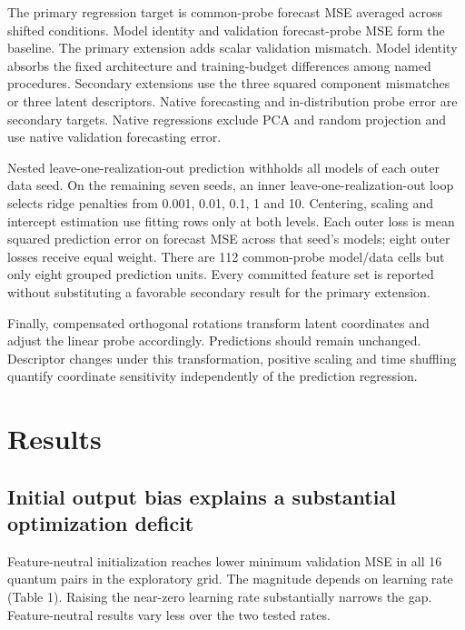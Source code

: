 \documentclass[
  11pt,
]{article}
\begin{document}
The primary regression target is common-probe forecast MSE averaged
across shifted conditions. Model identity and validation forecast-probe
MSE form the baseline. The primary extension adds scalar validation
mismatch. Model identity absorbs the fixed architecture and
training-budget differences among named procedures. Secondary extensions
use the three squared component mismatches or three latent descriptors.
Native forecasting and in-distribution probe error are secondary
targets. Native regressions exclude PCA and random projection and use
native validation forecasting error.

Nested leave-one-realization-out prediction withholds all models of each
outer data seed. On the remaining seven seeds, an inner
leave-one-realization-out loop selects ridge penalties from 0.001, 0.01,
0.1, 1 and 10. Centering, scaling and intercept estimation use fitting
rows only at both levels. Each outer loss is mean squared prediction
error on forecast MSE across that seed's models; eight outer losses
receive equal weight. There are 112 common-probe model/data cells but
only eight grouped prediction units. Every committed feature set is
reported without substituting a favorable secondary result for the
primary extension.

Finally, compensated orthogonal rotations transform latent coordinates
and adjust the linear probe accordingly. Predictions should remain
unchanged. Descriptor changes under this transformation, positive
scaling and time shuffling quantify coordinate sensitivity independently
of the prediction regression.

\hypertarget{results}{%
\section{Results}\label{results}}

\hypertarget{initial-output-bias-explains-a-substantial-optimization-deficit}{%
\subsection{Initial output bias explains a substantial optimization
deficit}\label{initial-output-bias-explains-a-substantial-optimization-deficit}}

Feature-neutral initialization reaches lower minimum validation MSE in
all 16 quantum pairs in the exploratory grid. The magnitude depends on
learning rate (Table 1). Raising the near-zero learning rate
substantially narrows the gap. Feature-neutral results vary less over
the two tested rates.
\end{document}
